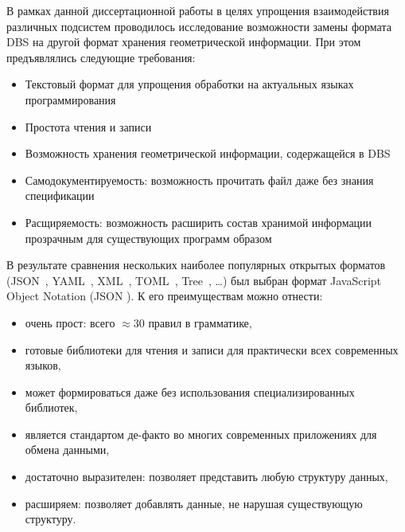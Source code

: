 В рамках данной диссертационной работы
в целях упрощения взаимодействия различных подсистем
проводилось исследование возможности замены
формата DBS
на другой формат хранения геометрической информации.
При этом предъявлялись следующие требования:
\begin{itemize}
  \item Текстовый формат для упрощения обработки на актуальных языках программирования
  \item Простота чтения и записи
  \item Возможность хранения геометрической информации, содержащейся в DBS
  \item Самодокументируемость:
  возможность прочитать файл даже без знания спецификации
  \item Расщиряемость:
  возможность расширить состав хранимой информации прозрачным для существующих программ образом
\end{itemize}

В результате сравнения нескольких
наиболее популярных открытых форматов
(JSON~\cite{bi:JSON},
YAML~\cite{bi:YAML},
XML~\cite{bi:XML},
TOML~\cite{bi:TOML},
Tree~\cite{bi:tree.d},
\dots)
был выбран формат
JavaScript Object Notation
(JSON
\cite{bi:JSON}).
К его преимуществам можно отнести:
\begin{itemize}
  \item очень прост:
  всего $\approx 30$ правил в грамматике,
  \item готовые библиотеки для чтения и записи
  для практически всех современных языков,
  \item может формироваться даже
  без использования специализированных библиотек,
  \item является стандартом де-факто во многих
  современных приложениях для обмена данными,
  \item достаточно выразителен:
  позволяет представить любую структуру данных,
  \item расширяем:
  позволяет добавлять данные,
  не нарушая существующую структуру.
\end{itemize}

